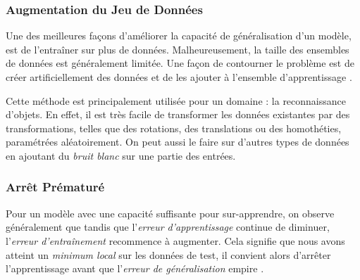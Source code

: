 \documentclass[a4paper, 11pt]{report}
\begin{document}
\subsubsection{Augmentation du Jeu de Données}
Une des meilleures façons d'améliorer la capacité de généralisation d'un modèle, est de l'entraîner sur plus de données.
Malheureusement, la taille des ensembles de données est généralement limitée.
Une façon de contourner le problème est de créer artificiellement des données et de les ajouter à l'ensemble d'apprentissage \citep{Tanner1987}.

Cette méthode est principalement utilisée pour un domaine : la reconnaissance d'objets.
En effet, il est très facile de transformer les données existantes par des transformations, telles que des rotations, des translations ou des homothéties, paramétrées aléatoirement.
On peut aussi le faire sur d'autres types de données en ajoutant du \emph{bruit blanc} sur une partie des entrées.
\subsubsection{Arrêt Prématuré}
Pour un modèle avec une capacité suffisante pour sur-apprendre, on observe généralement que tandis que l'\emph{erreur d'apprentissage} continue de diminuer, l'\emph{erreur d'entraînement} recommence à augmenter.
Cela signifie que nous avons atteint un \emph{minimum local} sur les données de test, il convient alors d'arrêter l'apprentissage avant que l'\emph{erreur de généralisation} empire \citep{Prechelt1998}.
\end{document}
